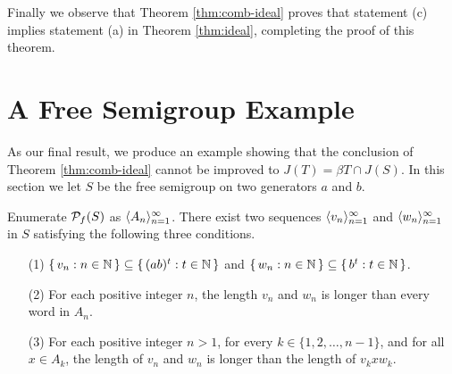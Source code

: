 Finally we observe that Theorem \ref{thm:comb-ideal} proves that statement (c) implies statement (a) in Theorem \ref{thm:ideal}, completing the proof of this theorem. 
\section{A Free Semigroup Example}
\label{sec:example}
As our final result, we produce an example showing that the conclusion of Theorem \ref{thm:comb-ideal} cannot be improved to $J(T) = \beta T \cap J(S)$.
In this section we let $S$ be the free semigroup on two generators $a$ and $b$.

\begin{lem}
  \label{lem:seqs}
  Enumerate $\mathcal{P}_f(S)$ as $\langle A_n \rangle_{n=1}^\infty$.
  There exist two sequences $\langle v_n \rangle_{n=1}^\infty$ and $\langle w_n \rangle_{n=1}^\infty$ in $S$ satisfying the following three conditions.
  \begin{itemize}
    \item[(1)]
      $\{\, v_n : n \in \mathbb{N} \,\} \subseteq \{\, (ab)^t : t \in \mathbb{N} \,\}$ and $\{\, w_n : n \in \mathbb{N} \,\} \subseteq \{\, b^t : t \in \mathbb{N} \,\}$.

    \item[(2)]
      For each positive integer $n$, the length $v_n$ and $w_n$ is longer than every word in $A_n$.

    \item[(3)]
      For each positive integer $n > 1$, for every $k \in \{1, 2, \ldots, n-1\}$, and for all $x \in A_k$, the length of $v_n$ and $w_n$ is longer than the length of $v_kxw_k$.
  \end{itemize}
\end{lem}
